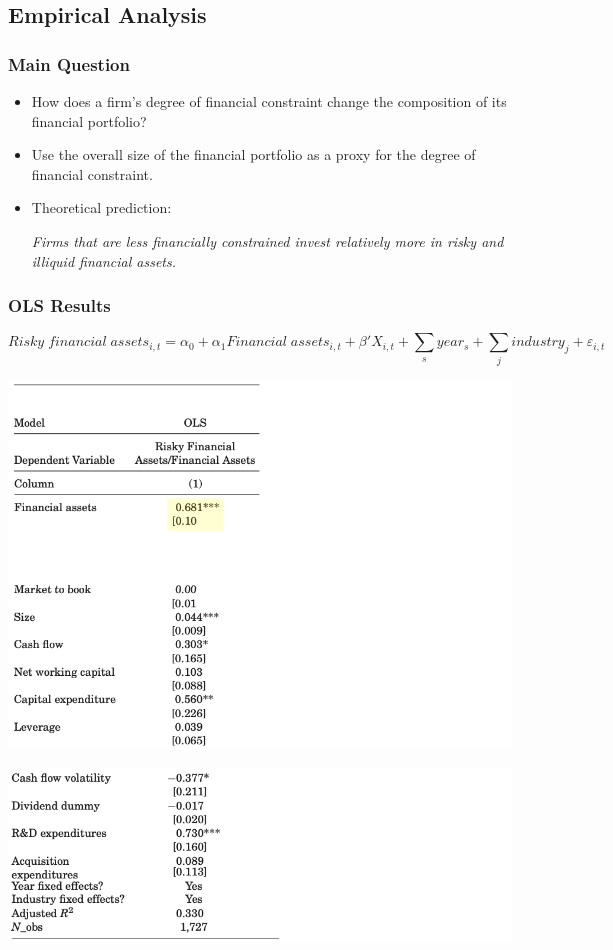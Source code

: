 \documentclass[handout]{beamer}
\begin{document}
\subsection{Empirical Analysis}




\begin{frame}
\frametitle{Main Question}
\begin{itemize}[<+->]
\item How does a firm's degree of financial constraint change the composition of its financial portfolio?
\bigskip
\item Use the overall size of the financial portfolio as a proxy for the degree of financial constraint.
\bigskip
\item Theoretical prediction:

\bigskip

\textit{Firms that are less financially constrained invest relatively more in risky and illiquid financial assets.}
\end{itemize}
\end{frame}


\begin{frame}
\frametitle{OLS Results}

\footnotesize

$$
Risky \; financial \; assets_{i,t} = \alpha_0 + \alpha_1 Financial \; assets_{i,t} + \beta' X_{i,t} + \sum_s year_s + \sum_j industry_j + \varepsilon_{i,t}
$$

\centering
\includegraphics[scale=0.21]{regression_1_ols}

\includegraphics[scale=0.21]{regression_2_ols}

\end{frame}
\end{document}
